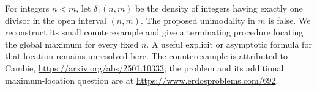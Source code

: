 For integers \(n<m\), let \(\delta_1(n,m)\) be the density of
integers having exactly one divisor in the open interval \((n,m)\).
The proposed unimodality in \(m\) is false. We reconstruct its
small counterexample and give a terminating procedure locating
the global maximum for every fixed \(n\). A useful explicit or
asymptotic formula for that location remains unresolved here.
The counterexample is attributed to Cambie,
\url{https://arxiv.org/abs/2501.10333};
the problem and its additional maximum-location question are at
\url{https://www.erdosproblems.com/692}.
